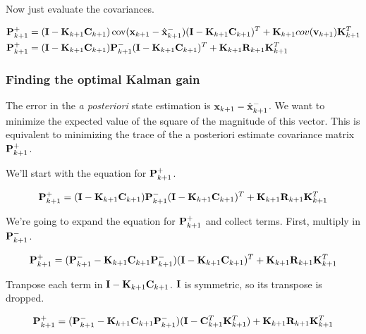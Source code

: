Now just evaluate the covariances.

\begin{align*}
  \mathbf{P}_{k+1}^+ &= (\mathbf{I} - \mathbf{K}_{k+1}\mathbf{C}_{k+1})
    \operatorname{cov}(\mathbf{x}_{k+1} - \hat{\mathbf{x}}_{k+1}^-)
    (\mathbf{I} - \mathbf{K}_{k+1}\mathbf{C}_{k+1})^T + \mathbf{K}_{k+1}cov(\mathbf{v}_{k+1})
    \mathbf{K}_{k+1}^T \\
  \mathbf{P}_{k+1}^+ &= (\mathbf{I} - \mathbf{K}_{k+1}\mathbf{C}_{k+1})\mathbf{P}_{k+1}^-
    (\mathbf{I} - \mathbf{K}_{k+1}\mathbf{C}_{k+1})^T + \mathbf{K}_{k+1}\mathbf{R}_{k+1}
    \mathbf{K}_{k+1}^T
\end{align*}

\subsubsection{Finding the optimal Kalman gain}

The error in the \textit{a posteriori} \gls{state} estimation is
$\mathbf{x}_{k+1} - \hat{\mathbf{x}}_{k+1}^-$. We want to minimize the expected value
of the square of the magnitude of this vector. This is equivalent to minimizing
the trace of the a posteriori estimate covariance matrix $\mathbf{P}_{k+1}^+$.

We'll start with the equation for $\mathbf{P}_{k+1}^+$.

\begin{equation*}
  \mathbf{P}_{k+1}^+ = (\mathbf{I} - \mathbf{K}_{k+1}\mathbf{C}_{k+1})\mathbf{P}_{k+1}^-
    (\mathbf{I} - \mathbf{K}_{k+1}\mathbf{C}_{k+1})^T + \mathbf{K}_{k+1}\mathbf{R}_{k+1}
    \mathbf{K}_{k+1}^T
\end{equation*}

We're going to expand the equation for $\mathbf{P}_{k+1}^+$ and collect terms.
First, multiply in $\mathbf{P}_{k+1}^-$.

\begin{equation*}
  \mathbf{P}_{k+1}^+ =
    (\mathbf{P}_{k+1}^- - \mathbf{K}_{k+1}\mathbf{C}_{k+1}\mathbf{P}_{k+1}^-)
    (\mathbf{I} - \mathbf{K}_{k+1}\mathbf{C}_{k+1})^T + \mathbf{K}_{k+1}\mathbf{R}_{k+1}
    \mathbf{K}_{k+1}^T
\end{equation*}

Tranpose each term in $\mathbf{I} - \mathbf{K}_{k+1}\mathbf{C}_{k+1}$. $\mathbf{I}$ is
symmetric, so its transpose is dropped.

\begin{equation*}
  \mathbf{P}_{k+1}^+ =
    (\mathbf{P}_{k+1}^- - \mathbf{K}_{k+1}\mathbf{C}_{k+1}\mathbf{P}_{k+1}^-)
    (\mathbf{I} - \mathbf{C}_{k+1}^T\mathbf{K}_{k+1}^T) +
    \mathbf{K}_{k+1}\mathbf{R}_{k+1} \mathbf{K}_{k+1}^T
\end{equation*}


